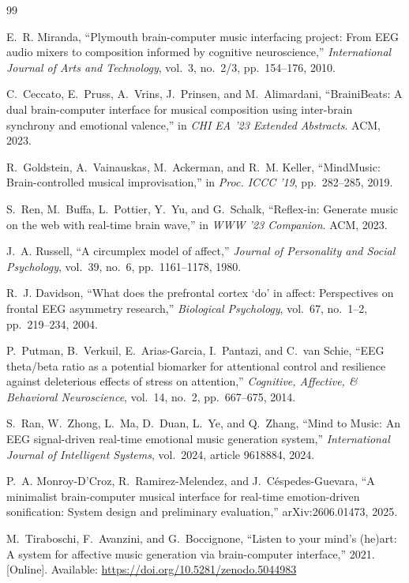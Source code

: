 \documentclass[manuscript,review,anonymous]{acmart}
\begin{document}
\begin{thebibliography}{99}

E.~R. Miranda, ``Plymouth brain-computer music interfacing project: From EEG audio mixers to composition informed by cognitive neuroscience,'' \textit{International Journal of Arts and Technology}, vol.~3, no.~2/3, pp.~154--176, 2010.

C.~Ceccato, E.~Pruss, A.~Vrins, J.~Prinsen, and M.~Alimardani, ``BrainiBeats: A dual brain-computer interface for musical composition using inter-brain synchrony and emotional valence,'' in \textit{CHI EA '23 Extended Abstracts}. ACM, 2023.

R.~Goldstein, A.~Vainauskas, M.~Ackerman, and R.~M. Keller, ``MindMusic: Brain-controlled musical improvisation,'' in \textit{Proc. ICCC '19}, pp.~282--285, 2019.

S.~Ren, M.~Buffa, L.~Pottier, Y.~Yu, and G.~Schalk, ``Reflex-in: Generate music on the web with real-time brain wave,'' in \textit{WWW '23 Companion}. ACM, 2023.

J.~A. Russell, ``A circumplex model of affect,'' \textit{Journal of Personality and Social Psychology}, vol.~39, no.~6, pp.~1161--1178, 1980.

R.~J. Davidson, ``What does the prefrontal cortex `do' in affect: Perspectives on frontal EEG asymmetry research,'' \textit{Biological Psychology}, vol.~67, no.~1--2, pp.~219--234, 2004.

P.~Putman, B.~Verkuil, E.~Arias-Garcia, I.~Pantazi, and C.~van Schie, ``EEG theta/beta ratio as a potential biomarker for attentional control and resilience against deleterious effects of stress on attention,'' \textit{Cognitive, Affective, \& Behavioral Neuroscience}, vol.~14, no.~2, pp.~667--675, 2014.

S.~Ran, W.~Zhong, L.~Ma, D.~Duan, L.~Ye, and Q.~Zhang, ``Mind to Music: An EEG signal-driven real-time emotional music generation system,'' \textit{International Journal of Intelligent Systems}, vol.~2024, article 9618884, 2024.

P.~A. Monroy-D'Croz, R.~Ramirez-Melendez, and J.~C\'espedes-Guevara, ``A minimalist brain-computer musical interface for real-time emotion-driven sonification: System design and preliminary evaluation,'' arXiv:2606.01473, 2025.

M.~Tiraboschi, F.~Avanzini, and G.~Boccignone, ``Listen to your mind's (he)art: A system for affective music generation via brain-computer interface,'' 2021. [Online]. Available: \url{https://doi.org/10.5281/zenodo.5044983}


\end{thebibliography}
\end{document}
